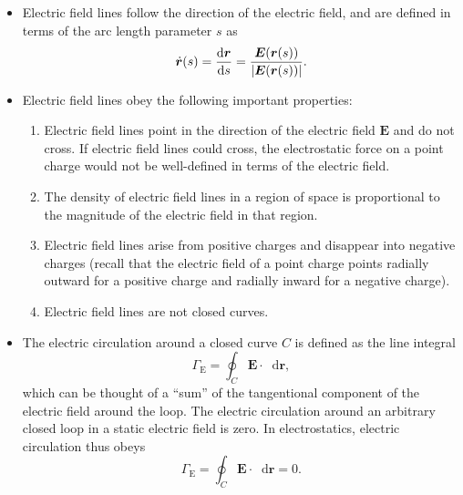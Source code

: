 \documentclass[11pt, a4paper]{article}
\newcommand{\diff}{\mathop{}\!\mathrm{d}} %
\renewcommand{\vec}[1]{\bm{#1}} %
\renewcommand{\r}{\vec{r}}
\newcommand{\E}{\vec{E}} %
\begin{document}
\begin{itemize}
    \item Electric field lines follow the direction of the electric field, and are defined in terms of the arc length parameter $ s $ as
    \begin{equation*}
        \dot{\vec{r}}(s) = \dv{\r}{s} = \frac{\E(\r(s))}{\abs{\E(\r(s))}}.
    \end{equation*}

    \item Electric field lines obey the following important properties:
    \begin{enumerate}
        \item Electric field lines point in the direction of the electric field $ \E $ and do not cross. If electric field lines could cross, the electrostatic force on a point charge would not be well-defined in terms of the electric field.

        \item The density of electric field lines in a region of space is proportional to the magnitude of the electric field in that region. 

        \item Electric field lines arise from positive charges and disappear into negative charges (recall that the electric field of a point charge points radially outward for a positive charge and radially inward for a negative charge).

        \item Electric field lines are not closed curves.
    \end{enumerate}

    \item The electric circulation around a closed curve $ C $ is defined as the line integral
    \begin{equation*}
        \Gamma_{\text{E}} = \oint_{C} \E \cdot \diff \r,
    \end{equation*}
    which can be thought of a ``sum'' of the tangentional component of the electric field around the loop. The electric circulation around an arbitrary closed loop in a static electric field is zero. In electrostatics, electric circulation thus obeys
    \begin{equation*}
        \Gamma_{\text{E}} = \oint_{C} \E \cdot \diff \r = 0.
    \end{equation*}


\end{itemize}
\end{document}
